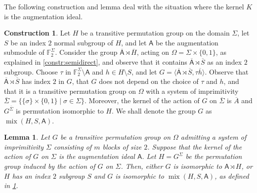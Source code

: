 \documentclass[a4paper]{amsart}
\newcommand{\FF}{\mathbb{F}}
\newcommand{\mix}{\mathop{\mathrm{mix}}}
\newcommand{\A}{\mathsf{A}}
\newtheorem{lemma}[theorem]{Lemma}
\theoremstyle{definition}
\newtheorem{construction}[theorem]{Construction}
\begin{document}
The following construction and lemma deal with the situation where the kernel $K$ is the augmentation ideal.

\begin{construction} \label{constr:mix}
     Let $H$ be a transitive permutation group on the domain $\Sigma$, let $S$ be an index $2$ normal subgroup of $H$, and let $\A$ be the augmentation submodule of $\FF_2^\Sigma$. Consider the group $\overline{\A} \rtimes \overline{H}$, acting on $\Omega = \Sigma \times \{0,1\}$, as explained in \cref{constr:semidirect}, and observe that it contains $\overline{\A}  \rtimes \overline{S}$ as an index $2$ subgroup. Choose $\tau$ in $\FF_2^\Sigma \setminus \A$ and $h \in H \setminus{S}$, and let $G =\langle  \overline{\A}  \rtimes \overline{S}, \tau \overline{h} \rangle$.
     Observe that $\overline{\A}  \rtimes \overline{S}$ has index $2$ in $G$, that $G$ does not depend on the choice of $\tau$ and $h$, and that it is a transitive permutation group on $\Omega$ with a system of imprimitivity 
     $\overline{\Sigma} = \{\{\sigma\} \times \{0,1\} \mid \sigma \in \Sigma\}$. Moreover, the kernel of the action of 
     $G$ on $\overline{\Sigma}$ is $\overline{A}$ and
     $G^{\overline{\Sigma}}$ is permutation isomorphic to $H$. We shall denote the group $G$ as $\mix(H,S,\A)$.
     \end{construction}

\begin{lemma}
 \label{lem:A}
    Let $G$ be a transitive permutation group on $\Omega$ admitting a system of imprimitivity $\Sigma$ consisting of $m$ blocks of size $2$. Suppose that the kernel of the action of $G$ on $\Sigma$ is the augmentation ideal $\A$. Let $H=G^\Sigma$ be the permutation group induced by the action of $G$ on $\Sigma$. 
    Then, either $G$ is isomorphic to $\A \rtimes H$, or $H$ has an index $2$ subgroup $S$ and $G$ is isomorphic to $\mix(H,S,\A)$, as defined in \cref{constr:mix}.
\end{lemma}
\end{document}

